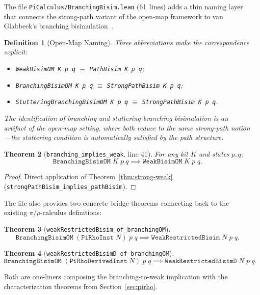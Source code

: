 \documentclass[11pt]{article}
\newtheorem{theorem}{Theorem}[section]
\newtheorem{definition}[theorem]{Definition}
\begin{document}
The file \texttt{PiCalculus/BranchingBisim.lean} (61~lines) adds a thin
naming layer that connects the strong-path variant of the open-map
framework to van Glabbeek's branching bisimulation~\cite{vanGlabbeek1993,vanGlabbeek2001}.

\begin{definition}[Open-Map Naming]
Three abbreviations make the correspondence explicit:
\begin{itemize}
\item \texttt{WeakBisimOM K p q} $\equiv$ \texttt{PathBisim K p q};
\item \texttt{BranchingBisimOM K p q} $\equiv$ \texttt{StrongPathBisim K p q};
\item \texttt{StutteringBranchingBisimOM K p q} $\equiv$ \texttt{StrongPathBisim K p q}.
\end{itemize}
The identification of branching and stuttering-branching bisimulation is
an artifact of the open-map setting, where both reduce to the same
strong-path notion---the stuttering condition is automatically
satisfied by the path structure.
\end{definition}

\begin{theorem}[\texttt{branching\_implies\_weak}, line 41]\label{thm:branching-weak}
For any kit $K$ and states $p, q$:
\[
  \texttt{BranchingBisimOM}\;K\;p\;q \implies
  \texttt{WeakBisimOM}\;K\;p\;q.
\]
\end{theorem}
\begin{proof}
Direct application of
Theorem~\ref{thm:strong-weak}
(\texttt{strongPathBisim\_implies\_pathBisim}).
\end{proof}

The file also provides two concrete bridge theorems connecting back to
the existing $\pi$/$\rho$-calculus definitions:

\begin{theorem}[\texttt{weakRestrictedBisim\_of\_branchingOM}]\label{thm:branch-concrete1}
\[
  \texttt{BranchingBisimOM}\;(\texttt{PiRhoInst}\;N)\;p\;q \implies
  \texttt{WeakRestrictedBisim}\;N\;p\;q.
\]
\end{theorem}

\begin{theorem}[\texttt{weakRestrictedBisimD\_of\_branchingOM}]\label{thm:branch-concrete2}
\[
  \texttt{BranchingBisimOM}\;(\texttt{PiRhoDerivedInst}\;N)\;p\;q \implies
  \texttt{WeakRestrictedBisimD}\;N\;p\;q.
\]
\end{theorem}

Both are one-liners composing the branching-to-weak implication with the
characterization theorems from Section~\ref{sec:pirho}.
\end{document}

